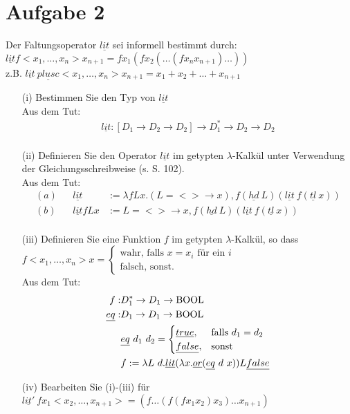 \documentclass[ngerman,a4paper]{report}
\begin{document}
\section*{Aufgabe 2}
Der Faltungsoperator $\underline{lit}$ sei informell bestimmt durch:
$\underline{lit} f<x_1,\dots,x_n>x_{n+1} = fx_1(fx_2(\dots(fx_n x_{n+1})\dots))$\\
z.B. $\underline{lit} \ \underline{plusc}<x_1,\dots,x_n>x_{n+1} = x_1 + x_2 + \dots + x_{n+1}$\\
\begin{itemize}
\item[(i)] Bestimmen Sie den Typ von $\underline{lit}$\\
Aus dem Tut:
\begin{align*}
\underline{lit}: [D_1 \rightarrow D_2 \rightarrow D_2] \rightarrow D_1^* \rightarrow D_2 \rightarrow D_2\\
\end{align*}
\item[(ii)] Definieren Sie den Operator $\underline{lit}$ im getypten $\lambda$-Kalkül unter Verwendung der Gleichungsschreibweise (s. S. 102).\\
Aus dem Tut:
\begin{align*}
	(a)&& \underline{lit} &:= \lambda	 f L x. (L = <> \rightarrow x), f (\underline{hd}\ L) (\underline{lit}\ f(\underline{tl}\ x))\\
	(b)&& \underline{lit}	 f L x &:= L = <> \rightarrow x, f (\underline{hd}\ L) (\underline{lit}\ f(\underline{tl}\ x))\\
\end{align*}
\item[(iii)] Definieren Sie eine Funktion $f$ im getypten $\lambda$-Kalkül, so dass\\
$
f<x_1,\dots,x_n>x=\begin{cases}
\text{wahr, falls } x=x_i \text{ für ein } i\\
\text{falsch, sonst.}
\end{cases}
$\\
Aus dem Tut:
\begin{align*}
	f :& D_1^* \rightarrow D_1 \rightarrow \text{\lstinline!BOOL!}\\
	\underline{eq} :& D_1 \rightarrow D_1 \rightarrow \text{\lstinline!BOOL!}\\
				 &\underline{eq}\ d_1 \ d_2 = \begin{cases} \underline{true}, &\text{falls } d_1 = d_2 \\ \underline{false}, &\text{sonst}
\end{cases}\\
&f := \lambda L\ d.\underline{lit}(\lambda x. \underline{or} (\underline{eq}\ d\ x)) L \underline{false}\\
\end{align*}
\item[(iv)] Bearbeiten Sie (i)-(iii) für $\underline{lit'}\ fx_1<x_2,\dots,x_{n+1}>=(f\dots(f(fx_1 x_2)x_3)\dots x_{n+1})$
\end{itemize}
\end{document}
